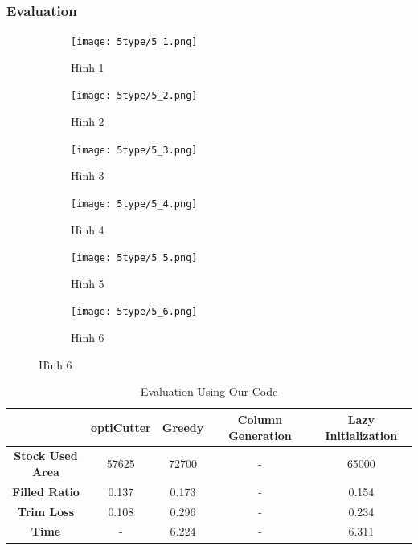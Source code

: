 \documentclass[a4paper]{article}
\begin{document}
\subsubsection*{Evaluation}
\begin{figure}[H] %
  \centering
  \begin{subfigure}[b]{0.48\textwidth}
    \centering
    \texttt{[image: 5type/5\_1.png]}
    \caption{Hình 1}
    \label{fig:1}
  \end{subfigure}
  \hfill
  \begin{subfigure}[b]{0.48\textwidth}
    \centering
    \texttt{[image: 5type/5\_2.png]}
    \caption{Hình 2}
    \label{fig:2}
  \end{subfigure}
  
  \vspace{0.3cm} %
  
  \begin{subfigure}[b]{0.48\textwidth}
    \centering
    \texttt{[image: 5type/5\_3.png]}
    \caption{Hình 3}
    \label{fig:3}
  \end{subfigure}
  \hfill
  \begin{subfigure}[b]{0.48\textwidth}
    \centering
    \texttt{[image: 5type/5\_4.png]}
    \caption{Hình 4}
    \label{fig:4}
  \end{subfigure}
  
  \vspace{0.3cm} %
  
  \begin{subfigure}[b]{0.48\textwidth}
    \centering
    \texttt{[image: 5type/5\_5.png]}
    \caption{Hình 5}
    \label{fig:5}
  \end{subfigure}
  \hfill
  \begin{subfigure}[b]{0.48\textwidth}
    \centering
    \texttt{[image: 5type/5\_6.png]}
    \caption{Hình 6}
    \label{fig:6}
  \end{subfigure}
                                                           
  \label{fig:all_images}
\end{figure}
\begin{table}[H]
        \centering
        \caption{Evaluation Using Our Code}
        \begin{tabular}{|c|c|c|c|c|}
            \hline
            \textbf{} & \textbf{optiCutter} & \textbf{Greedy} & \textbf{Column Generation} & \textbf{Lazy Initialization} \\ \hline
             \textbf{Stock Used Area} & 57625 & 72700 & - & 65000 \\ \hline
            \textbf{Filled Ratio} & 0.137 & 0.173 & - & 0.154 \\ \hline
            \textbf{Trim Loss} & 0.108 & 0.296 & - & 0.234 \\ \hline
            \textbf{Time} & - & 6.224 & - & 6.311 \\ \hline
        \end{tabular}
    \end{table}
\end{document}
